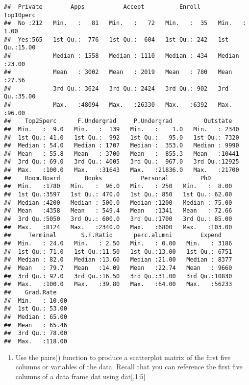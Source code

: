 \documentclass[
]{article}
\providecommand{\tightlist}{%
  \setlength{\itemsep}{0pt}\setlength{\parskip}{0pt}}
\begin{document}
\begin{verbatim}
##  Private        Apps           Accept          Enroll       Top10perc    
##  No :212   Min.   :   81   Min.   :   72   Min.   :  35   Min.   : 1.00  
##  Yes:565   1st Qu.:  776   1st Qu.:  604   1st Qu.: 242   1st Qu.:15.00  
##            Median : 1558   Median : 1110   Median : 434   Median :23.00  
##            Mean   : 3002   Mean   : 2019   Mean   : 780   Mean   :27.56  
##            3rd Qu.: 3624   3rd Qu.: 2424   3rd Qu.: 902   3rd Qu.:35.00  
##            Max.   :48094   Max.   :26330   Max.   :6392   Max.   :96.00  
##    Top25perc      F.Undergrad     P.Undergrad         Outstate    
##  Min.   :  9.0   Min.   :  139   Min.   :    1.0   Min.   : 2340  
##  1st Qu.: 41.0   1st Qu.:  992   1st Qu.:   95.0   1st Qu.: 7320  
##  Median : 54.0   Median : 1707   Median :  353.0   Median : 9990  
##  Mean   : 55.8   Mean   : 3700   Mean   :  855.3   Mean   :10441  
##  3rd Qu.: 69.0   3rd Qu.: 4005   3rd Qu.:  967.0   3rd Qu.:12925  
##  Max.   :100.0   Max.   :31643   Max.   :21836.0   Max.   :21700  
##    Room.Board       Books           Personal         PhD        
##  Min.   :1780   Min.   :  96.0   Min.   : 250   Min.   :  8.00  
##  1st Qu.:3597   1st Qu.: 470.0   1st Qu.: 850   1st Qu.: 62.00  
##  Median :4200   Median : 500.0   Median :1200   Median : 75.00  
##  Mean   :4358   Mean   : 549.4   Mean   :1341   Mean   : 72.66  
##  3rd Qu.:5050   3rd Qu.: 600.0   3rd Qu.:1700   3rd Qu.: 85.00  
##  Max.   :8124   Max.   :2340.0   Max.   :6800   Max.   :103.00  
##     Terminal       S.F.Ratio      perc.alumni        Expend     
##  Min.   : 24.0   Min.   : 2.50   Min.   : 0.00   Min.   : 3186  
##  1st Qu.: 71.0   1st Qu.:11.50   1st Qu.:13.00   1st Qu.: 6751  
##  Median : 82.0   Median :13.60   Median :21.00   Median : 8377  
##  Mean   : 79.7   Mean   :14.09   Mean   :22.74   Mean   : 9660  
##  3rd Qu.: 92.0   3rd Qu.:16.50   3rd Qu.:31.00   3rd Qu.:10830  
##  Max.   :100.0   Max.   :39.80   Max.   :64.00   Max.   :56233  
##    Grad.Rate     
##  Min.   : 10.00  
##  1st Qu.: 53.00  
##  Median : 65.00  
##  Mean   : 65.46  
##  3rd Qu.: 78.00  
##  Max.   :118.00
\end{verbatim}

\begin{enumerate}
\def\labelenumi{\roman{enumi}.}
\setcounter{enumi}{1}
\tightlist
\item
  Use the pairs() function to produce a scatterplot matrix of the first
  five columns or variables of the data. Recall that you can reference
  the first five columns of a data frame dat using dat{[},1:5{]}
\end{enumerate}
\end{document}
